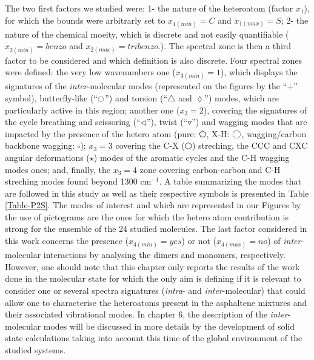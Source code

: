 	The two first factors we studied were: 1- the nature of the heteroatom (factor $x_1$), for which the bounds were arbitrarly set to $x_{1(min)}=C$ and $x_{1(max)}=S$; 2- the nature of the chemical moeity, which is discrete and not easily quantifiable ($x_{2(min)}=benzo$ and $x_{2(max)}=tribenzo$.). The spectral zone is then a third factor to be considered and which definition is also discrete. 
	Four spectral zones were defined: the very low wavenumbers one ($x_{3(min)}=1$), which displays the signatures of the \textit{inter}-molecular modes (represented on the figures by the “$ + $” symbol), butterfly-like (“$\ocircle$”) and torsion (“$\triangle$ and $\lozenge$”) modes, which are particularly active in this region; another one ($x_3=2$), covering the signatures of the cycle breathing and scissoring (“$\lhd$”), twist (“$\triangledown$”) and wagging modes that are impacted by the presence of the hetero atom (pure: $\pentagon$, X-H: $\octagon$, wagging/carbon backbone wagging: $\square$); $x_3=3$ covering the C-X ($\varhexagon$) streching, the CCC and CXC angular deformations ($\star$) modes of the aromatic cycles and the C-H wagging modes ones; and, finally, the $x_3=4$ zone covering carbon-carbon and C-H streching modes found beyond 1300 cm$^{-1}$.  A table summarizing the modes that are followed in this study as well as their respective symbols is presented in Table \ref{Table-P2S}. The modes of interest and which are represented in our Figures by the use of pictograms are the ones for which the hetero atom contribution is strong for the ensemble of the 24 studied molecules. The last factor considered in this work concerns the presence ($x_{4(min)}=yes$) or not ($x_{4(max)}=no$) of \textit{inter}-molecular interactions by analysing the dimers and monomers, respectively. However, one should note that this chapter only reports the results of the work done in the molecular state for which the only aim is defining if it is relevant to consider one or several spectra signatures (\textit{intra}- and \textit{inter}-molecular) that could allow one to characterise the heteroatoms present in the asphaltene mixtures and their associated vibrational modes. In chapter 6, the description of the \textit{inter}-molecular modes will be discussed in more details by the development of solid state calculations taking into account this time of the global environment of the studied systems.\\
	
